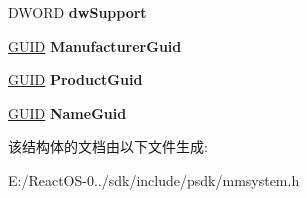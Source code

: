 \begin{DoxyCompactItemize}
D\+W\+O\+RD {\bfseries dw\+Support}
\item 
\mbox{\label{structtag_w_a_v_e_o_u_t_c_a_p_s2_w_a73edc717e7a8516d84b41b3878776845}} 
\hyperlink{interface_g_u_i_d}{G\+U\+ID} {\bfseries Manufacturer\+Guid}
\item 
\mbox{\label{structtag_w_a_v_e_o_u_t_c_a_p_s2_w_a067cfb2f6a34341fa8286c769279b95d}} 
\hyperlink{interface_g_u_i_d}{G\+U\+ID} {\bfseries Product\+Guid}
\item 
\mbox{\label{structtag_w_a_v_e_o_u_t_c_a_p_s2_w_af7321e4f48f2860fe56f2728892ab153}} 
\hyperlink{interface_g_u_i_d}{G\+U\+ID} {\bfseries Name\+Guid}
\end{DoxyCompactItemize}


该结构体的文档由以下文件生成\+:\begin{DoxyCompactItemize}
\item 
E\+:/\+React\+O\+S-\/0../sdk/include/psdk/mmsystem.\+h\end{DoxyCompactItemize}
